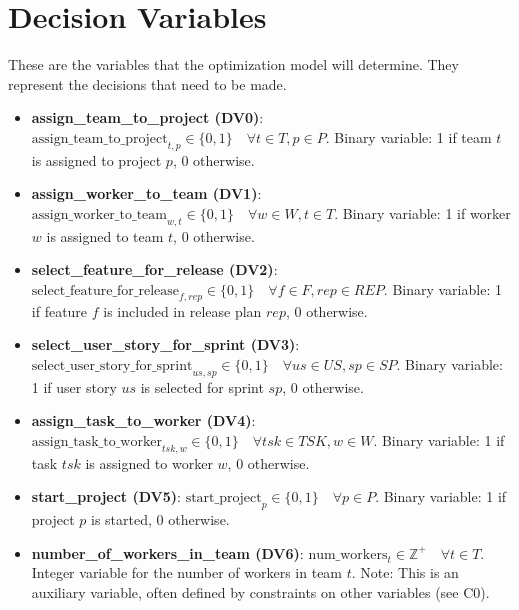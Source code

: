 \documentclass[11pt, a4paper]{article}
\begin{document}
\section{Decision Variables}
\label{sec:dvs}
These are the variables that the optimization model will determine. They represent the decisions that need to be made.

\begin{itemize}
    \item \textbf{assign\_team\_to\_project (DV0)}: $\text{assign\_team\_to\_project}_{t,p} \in \{0, 1\} \quad \forall t \in T, p \in P$. Binary variable: 1 if team $t$ is assigned to project $p$, 0 otherwise.

    \item \textbf{assign\_worker\_to\_team (DV1)}: $\text{assign\_worker\_to\_team}_{w,t} \in \{0, 1\} \quad \forall w \in W, t \in T$. Binary variable: 1 if worker $w$ is assigned to team $t$, 0 otherwise.

    \item \textbf{select\_feature\_for\_release (DV2)}: $\text{select\_feature\_for\_release}_{f,rep} \in \{0, 1\} \quad \forall f \in F, rep \in REP$. Binary variable: 1 if feature $f$ is included in release plan $rep$, 0 otherwise.

    \item \textbf{select\_user\_story\_for\_sprint (DV3)}: $\text{select\_user\_story\_for\_sprint}_{us,sp} \in \{0, 1\} \quad \forall us \in US, sp \in SP$. Binary variable: 1 if user story $us$ is selected for sprint $sp$, 0 otherwise.

    \item \textbf{assign\_task\_to\_worker (DV4)}: $\text{assign\_task\_to\_worker}_{tsk,w} \in \{0, 1\} \quad \forall tsk \in TSK, w \in W$. Binary variable: 1 if task $tsk$ is assigned to worker $w$, 0 otherwise.

    \item \textbf{start\_project (DV5)}: $\text{start\_project}_{p} \in \{0, 1\} \quad \forall p \in P$. Binary variable: 1 if project $p$ is started, 0 otherwise.
    
    \item \textbf{number\_of\_workers\_in\_team (DV6)}: $\text{num\_workers}_{t} \in \mathbb{Z}^+ \quad \forall t \in T$. Integer variable for the number of workers in team $t$. Note: This is an auxiliary variable, often defined by constraints on other variables (see C0).
\end{itemize}
\end{document}
